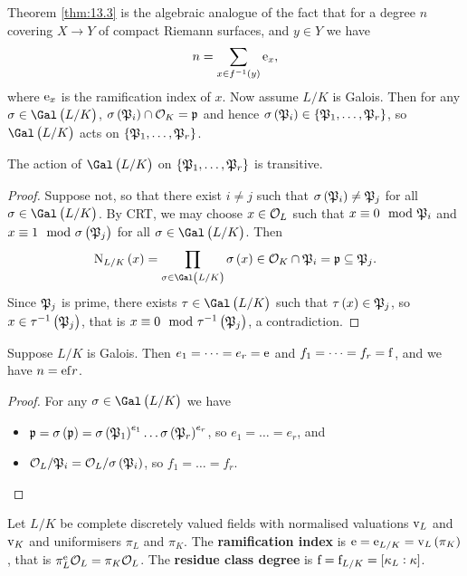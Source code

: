 Theorem \ref{thm:13.3} is the algebraic analogue of the fact that for a degree $ n $ covering $ X \to Y $ of compact Riemann surfaces, and $ y \in Y $ we have
$$ n = \sum_{x \in f^{-1}\br{y}} \e_x, $$
where $ \mathrm{e}_x $ is the ramification index of $ x $. Now assume $ L / K $ is Galois. Then for any $ \sigma \in \Gal\br{L / K} $, $ \sigma\br{\pp_i} \cap \OOO_K = \ppp $ and hence $ \sigma\br{\pp_i} \in \cbr{\pp_1, \dots, \pp_r} $, so $ \Gal\br{L / K} $ acts on $ \cbr{\pp_1, \dots, \pp_r} $.

\begin{proposition}
\label{prop:13.4}
The action of $ \Gal\br{L / K} $ on $ \cbr{\pp_1, \dots, \pp_r} $ is transitive.
\end{proposition}

\begin{proof}
Suppose not, so that there exist $ i \ne j $ such that $ \sigma\br{\pp_i} \ne \pp_j $ for all $ \sigma \in \Gal\br{L / K} $. By CRT, we may choose $ x \in \mathcal{O}_L $ such that $ x \equiv 0 \mod {\mathfrak{P}}_i $ and $ x \equiv 1 \mod \sigma\br{\pp_j} $ for all $ \sigma \in \Gal\br{L / K} $. Then
$$ \N_{L / K}\br{x} = \prod_{\sigma \in \Gal\br{L / K}} \sigma\br{x} \in \OOO_K \cap \pp_i = \ppp \subseteq \pp_j. $$
Since $ \mathfrak{P}_j $ is prime, there exists $ \tau \in \Gal\br{L / K} $ such that $ \tau\br{x} \in \pp_j $, so $ x \in \tau^{-1}\br{\pp_j} $, that is $ x \equiv 0 \mod \tau^{-1}\br{\pp_j} $, a contradiction.
\end{proof}

\pagebreak

\begin{corollary}
Suppose $ L / K $ is Galois. Then $ e_1 = \dots = e_r = \mathrm{e} $ and $ f_1 = \dots = f_r = \mathrm{f} $, and we have $ n = \mathrm{e}\mathrm{f} r $.
\end{corollary}

\begin{proof}
For any $ \sigma \in \Gal\br{L / K} $ we have
\begin{itemize}
\item $ \ppp = \sigma\br{\ppp} = \sigma\br{\pp_1}^{e_1} \dots \sigma\br{\pp_r}^{e_r} $, so $ e_1 = \dots = e_r $, and
\item $ \OOO_L / \pp_i = \OOO_L / \sigma\br{\pp_i} $, so $ f_1 = \dots = f_r $.
\end{itemize}
\end{proof}

Let $ L / K $ be complete discretely valued fields with normalised valuations $ \mathrm{v}_L $ and $ \mathrm{v}_K $ and uniformisers $ \pi_L $ and $ \pi_K $. The \textbf{ramification index} is $ \e = \e_{L / K} = \v_L\br{\pi_K} $, that is $ \pi_L^{\mathrm{e}}\mathcal{O}_L = \pi_K\mathcal{O}_L $. The \textbf{residue class degree} is $ \f = \f_{L / K} = \sbr{\kappa_L : \kappa} $.


